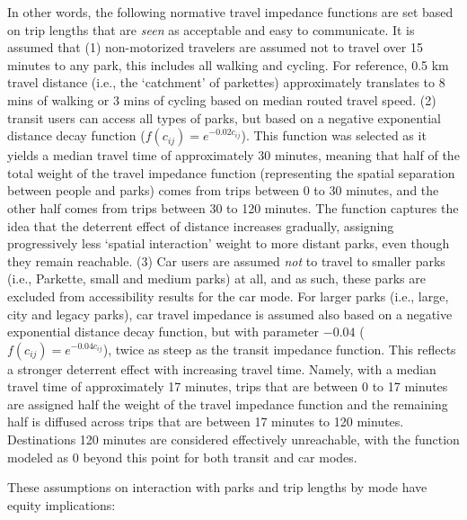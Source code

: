\documentclass[
11pt, %
oneside, %
english, %
singlespacing, %
]{macthesis} %
\begin{document}
In other words, the following normative travel impedance functions are set based on trip lengths that are \emph{seen} as acceptable and easy to communicate. It is assumed that (1) non-motorized travelers are assumed not to travel over 15 minutes to any park, this includes all walking and cycling. For reference, 0.5 km travel distance (i.e., the `catchment' of parkettes) approximately translates to 8 mins of walking or 3 mins of cycling based on median routed travel speed. (2) transit users can access all types of parks, but based on a negative exponential distance decay function (\(f(c_{ij}) = e^{-0.02c_{ij}}\)). This function was selected as it yields a median travel time of approximately 30 minutes, meaning that half of the total weight of the travel impedance function (representing the spatial separation between people and parks) comes from trips between 0 to 30 minutes, and the other half comes from trips between 30 to 120 minutes. The function captures the idea that the deterrent effect of distance increases gradually, assigning progressively less `spatial interaction' weight to more distant parks, even though they remain reachable. (3) Car users are assumed \emph{not} to travel to smaller parks (i.e., Parkette, small and medium parks) at all, and as such, these parks are excluded from accessibility results for the car mode. For larger parks (i.e., large, city and legacy parks), car travel impedance is assumed also based on a negative exponential distance decay function, but with parameter \(-0.04\) (\(f(c_{ij}) = e^{-0.04c_{ij}}\)), twice as steep as the transit impedance function. This reflects a stronger deterrent effect with increasing travel time. Namely, with a median travel time of approximately 17 minutes, trips that are between 0 to 17 minutes are assigned half the weight of the travel impedance function and the remaining half is diffused across trips that are between 17 minutes to 120 minutes. Destinations 120 minutes are considered effectively unreachable, with the function modeled as 0 beyond this point for both transit and car modes.

These assumptions on interaction with parks and trip lengths by mode have equity implications:
\end{document}
